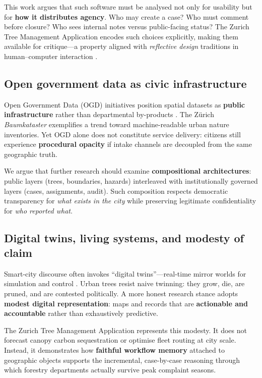 \documentclass[12pt,a4paper]{article}
\newcommand{\appname}{Zurich Tree Management Application}
\begin{document}
This work argues that such software must be analysed not only for usability but for \textbf{how it distributes agency}. Who may create a case? Who must comment before closure? Who sees internal notes versus public-facing status? The \appname{} encodes such choices explicitly, making them available for critique---a property aligned with \emph{reflective design} traditions in human--computer interaction \cite{sengers2005}.

\subsection{Open government data as civic infrastructure}

Open Government Data (OGD) initiatives position spatial datasets as \textbf{public infrastructure} rather than departmental by-products \cite{janssen2012}. The Zürich \emph{Baumkataster} exemplifies a trend toward machine-readable urban nature inventories. Yet OGD alone does not constitute service delivery: citizens still experience \textbf{procedural opacity} if intake channels are decoupled from the same geographic truth.

We argue that further research should examine \textbf{compositional architectures}: public layers (trees, boundaries, hazards) interleaved with institutionally governed layers (cases, assignments, audit). Such composition respects democratic transparency for \emph{what exists in the city} while preserving legitimate confidentiality for \emph{who reported what}.

\subsection{Digital twins, living systems, and modesty of claim}

Smart-city discourse often invokes ``digital twins''---real-time mirror worlds for simulation and control \cite{batty2018}. Urban trees resist naive twinning: they grow, die, are pruned, and are contested politically. A more honest research stance adopts \textbf{modest digital representation}: maps and records that are \textbf{actionable and accountable} rather than exhaustively predictive.

The \appname{} represents this modesty. It does not forecast canopy carbon sequestration or optimise fleet routing at city scale. Instead, it demonstrates how \textbf{faithful workflow memory} attached to geographic objects supports the incremental, case-by-case reasoning through which forestry departments actually survive peak complaint seasons.
\end{document}
